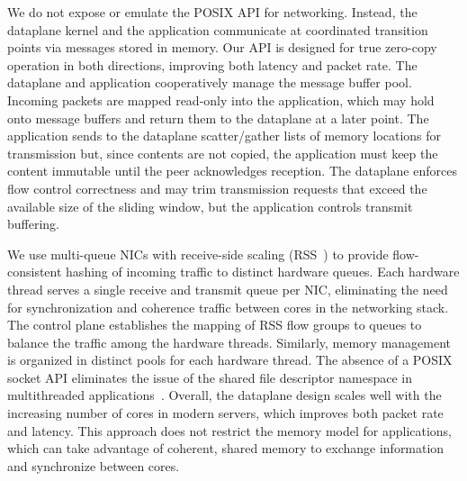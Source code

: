  We do
not expose or emulate the POSIX API for networking.  Instead, the
dataplane kernel and the application communicate at coordinated transition points
via messages stored in
memory. %
Our API is designed for true zero-copy
operation in both directions, improving both latency and packet
rate. The dataplane and application cooperatively manage the message
buffer pool. Incoming packets are mapped read-only into the
application, which may hold onto message buffers and return them to
the dataplane at a later point.  The application sends to the
dataplane scatter/gather lists of memory locations for transmission
but, since contents are not copied, the application must keep the
content immutable until the peer acknowledges reception. The
dataplane enforces flow control correctness and may trim transmission
requests that exceed the available size of the sliding window, but
the application controls transmit buffering.

 We use
multi-queue NICs with receive-side scaling (RSS~\cite{url:rss}) to provide flow-consistent hashing
of incoming traffic to distinct hardware queues. Each hardware
thread serves a single receive and transmit queue per NIC, eliminating
the need for synchronization and
coherence traffic between cores in the networking stack.  The control
plane establishes the mapping of RSS flow groups to queues to balance
the traffic among the hardware threads.  Similarly, memory management
is organized in distinct pools for each hardware thread. The absence
of a POSIX socket API eliminates the issue of the shared file
descriptor namespace in multithreaded
applications~\cite{DBLP:conf/sosp/ClementsKZMK13}. Overall, the \ix
dataplane design scales well with the increasing number of cores in
modern servers, which improves both packet rate and latency. This
approach does not restrict the memory model for applications, which
can take advantage of coherent, shared memory to exchange information and
synchronize between cores.


